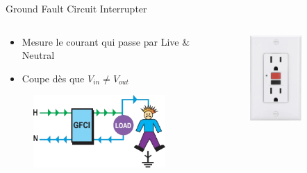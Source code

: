 \begin{frame}{Ground Fault Circuit Interrupter}
    \begin{columns}
        \begin{column}{0.7\textwidth}
            \begin{itemize}
                \item Mesure le courant qui passe par Live \& Neutral
                \item Coupe dès que $V_{in} \neq V_{out}$ 
            \end{itemize}
            \vspace{24pt}
            \begin{figure}
                \centering
                \includegraphics[width=0.9\textwidth]{pictures/gfci-example.png}
            \end{figure}
        \end{column}
        \begin{column}{0.3\textwidth}
            \begin{figure}
                \centering
                \includegraphics[width=0.66\textwidth]{pictures/gfci-outlet.png}
            \end{figure}
        \end{column}
    \end{columns}
\end{frame}